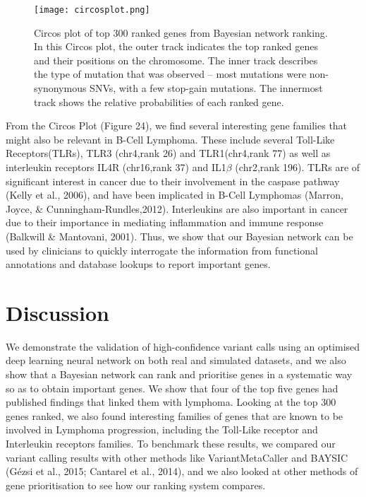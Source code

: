 \documentclass{article}
\begin{document}
\begin{figure}[H]
\texttt{[image: circosplot.png]}
\caption{Circos plot of top 300 ranked genes from Bayesian network ranking. In this Circos plot, the outer track indicates the top ranked genes and their positions on the chromosome. The inner track describes the type of mutation that was observed -- most mutations were non-synonymous SNVs, with a few stop-gain mutations. The innermost track shows the relative probabilities of each ranked gene.}
\centering
\end{figure}

From the Circos Plot (Figure 24), we find several interesting gene families that might also be relevant in B-Cell Lymphoma. These include several Toll-Like Receptors(TLRs), TLR3 (chr4,rank 26) and TLR1(chr4,rank 77) as well as interleukin receptors IL4R (chr16,rank 37) and IL1$\beta$ (chr2,rank 196). TLRs are of significant interest in cancer due to their involvement in the caspase pathway (Kelly et al., 2006), and have been implicated in B-Cell Lymphomas (Marron, Joyce, \& Cunningham-Rundles,2012). Interleukins are also important in cancer due to their importance in mediating inflammation and immune response (Balkwill \& Mantovani, 2001). Thus, we show that our Bayesian network can be used by clinicians to quickly interrogate the information from functional annotations and database lookups to report important genes. 

\newpage
\section{Discussion}
We demonstrate the validation of high-confidence variant calls using an optimised deep learning neural network on both real and simulated datasets, and we also show that a Bayesian network can rank and prioritise genes in a systematic way so as to obtain important genes. We show that four of the top five genes had published findings that linked them with lymphoma. Looking at the top 300 genes ranked, we also found interesting families of genes that are known to be involved in Lymphoma progression, including the Toll-Like receptor and Interleukin receptors families. To benchmark these results, we compared our variant calling results with other methods like VariantMetaCaller and BAYSIC (Gézsi et al., 2015; Cantarel et al., 2014), and we also looked at other methods of gene prioritisation to see how our ranking system compares.
\end{document}

